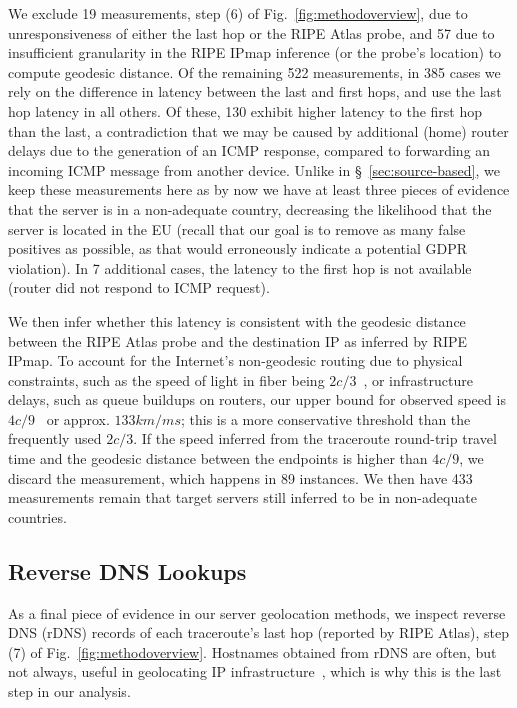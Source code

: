 We exclude 19 measurements, step (6) of Fig.~\ref{fig:methodoverview}, due to unresponsiveness of either the last hop or the 
RIPE Atlas probe, and 57 due to insufficient
granularity in the RIPE IPmap inference (or the probe's location) to compute geodesic distance. 
Of the remaining 522 measurements, in 385 cases we rely on the difference in latency between 
the last and first hops, and use the last hop latency in all others. Of these,
130 exhibit higher latency to the first hop than the last, a contradiction that we 
may be caused by additional (home) router delays due to the generation of an ICMP response,
compared to forwarding an incoming ICMP message from another device. Unlike in
\S~\ref{sec:source-based}, we keep these measurements here as by now we have
at least three pieces of evidence that the server is in a non-adequate country,
decreasing the likelihood that the server is located in the EU (recall that our goal
is to remove as many false positives as possible, as that would erroneously indicate a potential GDPR violation).
In 7 additional cases, the
latency to the first hop is not available (router did not respond to ICMP request).

We then infer whether this latency is consistent with the geodesic distance between 
the RIPE Atlas probe and the destination IP as inferred by RIPE IPmap. 
To account for the Internet's non-geodesic routing due to 
physical constraints, such as the speed of light in fiber being $2c/3$~\cite{10.1145/3402413.3402415}, 
or infrastructure delays, such as queue buildups on routers, our
upper bound for observed speed is $4c/9$~\cite{10.1145/1177080.1177090} or approx. $133 km/ms$; 
this is a more conservative 
threshold than the frequently used $2c/3$. 
If the speed inferred from the 
traceroute round-trip travel time and the geodesic distance between the endpoints 
is higher than $4c/9$, we discard the measurement,
which happens in 89 instances. We then have 433 measurements remain that target servers 
still inferred to be in non-adequate countries.

\subsection{Reverse DNS Lookups}

As a final piece of evidence in our server geolocation methods, we inspect
reverse DNS (rDNS) records of each traceroute's last hop
(reported by RIPE Atlas), step (7) of Fig.~\ref{fig:methodoverview}. Hostnames obtained from rDNS are often, 
but not always, useful in geolocating IP infrastructure~\cite{geodns}, 
which is why this is the last step in our analysis. 

